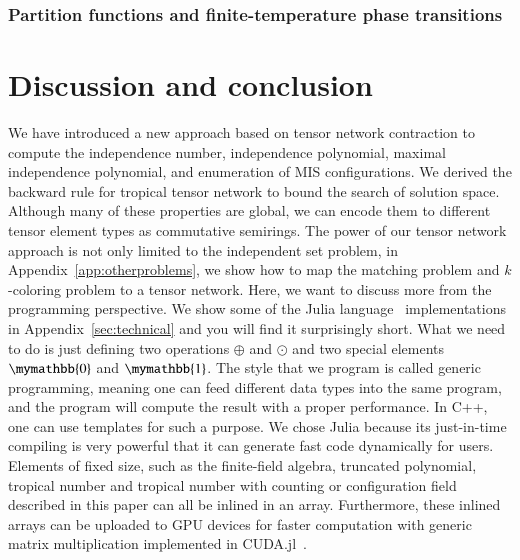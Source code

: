 \documentclass[onefignum, onetabnum]{siamart190516}
\newcommand{\<}{\langle}
\renewcommand{\>}{\rangle}
\newcommand{\App}[1]{Appendix~\ref{#1}}
\begin{document}
\subsubsection{Partition functions and finite-temperature phase transitions}



\section{Discussion and conclusion}
We have introduced a new approach based on tensor network contraction to compute the independence number, independence polynomial, maximal independence polynomial, and enumeration of MIS configurations. We derived the backward rule for tropical tensor network to bound the search of solution space. Although many of these properties are global, we can encode them to different tensor element types as commutative semirings.
The power of our tensor network approach is not only limited to the independent set problem, in \App{app:otherproblems}, we show how to map the matching problem and $k$-coloring problem to a tensor network. Here, we want to discuss more from the programming perspective. We show some of the Julia language~\cite{Bezanson2012} implementations in Appendix~\ref{sec:technical} and you will find it surprisingly short.
What we need to do is just defining two operations $\oplus$ and $\odot$ and two special elements $\mymathbb{0}$ and $\mymathbb{1}$. The style that we program is called generic programming, meaning one can feed different data types into the same program, and the program will compute the result with a proper performance. In C++, one can use templates for such a purpose. We chose Julia because its just-in-time compiling is very powerful that it can generate fast code dynamically for users. Elements of fixed size, such as the finite-field algebra, truncated polynomial, tropical number and tropical number with counting or configuration field described in this paper can all be inlined in an array.
Furthermore, these inlined arrays can be uploaded to GPU devices for faster computation with generic matrix multiplication implemented in CUDA.jl~\cite{Besard2018}.




\appendix
\end{document}
